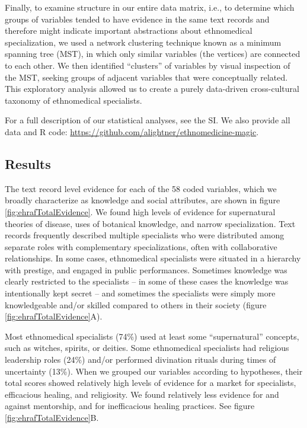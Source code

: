 \documentclass[
  11pt,
]{article}
\begin{document}
Finally, to examine structure in our entire data matrix, i.e., to determine which groups of variables tended to have evidence in the same text records and therefore might indicate important abstractions about ethnomedical specialization, we used a network clustering technique known as a minimum spanning tree (MST), in which only similar variables (the vertices) are connected to each other. We then identified ``clusters'' of variables by visual inspection of the MST, seeking groups of adjacent variables that were conceptually related. This exploratory analysis allowed us to create a purely data-driven cross-cultural taxonomy of ethnomedical specialists.

For a full description of our statistical analyses, see the SI. We also provide all data and R code: \url{https://github.com/alightner/ethnomedicine-magic}.

\hypertarget{results}{%
\subsection{Results}\label{results}}

The text record level evidence for each of the 58 coded variables, which we broadly characterize as knowledge and social attributes, are shown in figure \ref{fig:ehrafTotalEvidence}. We found high levels of evidence for supernatural theories of disease, uses of botanical knowledge, and narrow specialization. Text records frequently described multiple specialists who were distributed among separate roles with complementary specializations, often with collaborative relationships. In some cases, ethnomedical specialists were situated in a hierarchy with prestige, and engaged in public performances. Sometimes knowledge was clearly restricted to the specialists -- in some of these cases the knowledge was intentionally kept secret -- and sometimes the specialists were simply more knowledgeable and/or skilled compared to others in their society (figure \ref{fig:ehrafTotalEvidence}A).

Most ethnomedical specialists (74\%) used at least some ``supernatural'' concepts, such as witches, spirits, or deities. Some ethnomedical specialists had religious leadership roles (24\%) and/or performed divination rituals during times of uncertainty (13\%). When we grouped our variables according to hypotheses, their total scores showed relatively high levels of evidence for a market for specialists, efficacious healing, and religiosity. We found relatively less evidence for and against mentorship, and for inefficacious healing practices. See figure \ref{fig:ehrafTotalEvidence}B.
\end{document}
